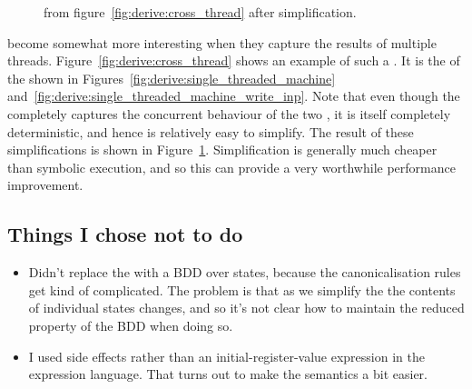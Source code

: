 \begin{figure}
  \caption{\STateMachine from figure~\ref{fig:derive:cross_thread}
    after {\StateMachine} simplification.}
  \label{fig:derive:cross_thread_opt}
\end{figure}

\STateMachines become somewhat more interesting when they capture the
results of multiple threads.  Figure~\ref{fig:derive:cross_thread}
shows an example of such a {\StateMachine}.  It is the
 of the {\StateMachines} shown in
Figures~\ref{fig:derive:single_threaded_machine}
and~\ref{fig:derive:single_threaded_machine_write_inp}.  Note that
even though the {\StateMachine} completely captures the concurrent
behaviour of the two {\StateMachines}, it is itself completely
deterministic, and hence is relatively easy to simplify.  The result
of these simplifications is shown in
Figure~\ref{fig:derive:cross_thread_opt}.  Simplification is generally
much cheaper than symbolic execution, and so this can provide a very
worthwhile performance improvement.

\subsection{Things I chose not to do}

\begin{itemize}
\item
  Didn't replace the  with a BDD over states, because the
  canonicalisation rules get kind of complicated.  The problem is that
  as we simplify the {\StateMachine} the contents of individual states
  changes, and so it's not clear how to maintain the reduced property
  of the BDD when doing so.
\item
  I used  side effects rather than an
  initial-register-value expression in the expression language.
  That turns out to make the  semantics a bit easier.
\end{itemize}

